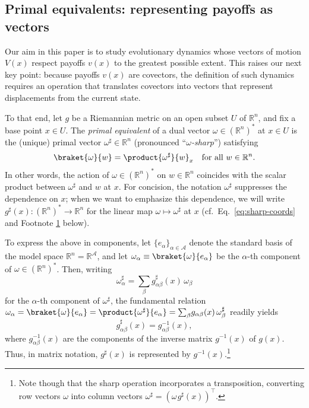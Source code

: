 \documentclass[reqno]{amsart}
\theoremstyle{plain}
\theoremstyle{definition}
\theoremstyle{remark}
\numberwithin{equation}{section}
\numberwithin{theorem}{section}
\begin{document}
\subsection{Primal equivalents: representing payoffs as vectors}
\label{sec:sharp}

Our aim in this paper is to study evolutionary dynamics whose vectors of motion ${V}(x)$ respect payoffs ${v}(x)$ to the greatest possible extent.
This raises our next key point:
because payoffs ${v}(x)$ are covectors, the definition of such dynamics requires an operation that translates covectors into vectors that represent displacements from the current state.

To that end, let $g$ be a Riemannian metric on an open subset ${U}$ of ${{\mathbb{R}}^{n}}$, and fix a base point $x\in{U}$.
The \emph{primal equivalent} of a dual vector $\omega \in{({\mathbb{R}}^{n})^{\ast}}$ at $x\in{U}$ is the (unique) primal vector $\omega^{\sharp} \in {{\mathbb{R}}^{n}}$ (pronounced ``\emph{$\omega$-sharp}'') satisfying
\begin{equation}
\label{eq:sharp}
\braket{\omega}{w}
=\product{\omega^{\sharp}}{w}_x	
	\quad
	\text{for all $w\in{{\mathbb{R}}^{n}}$}.
\end{equation}
In other words, the action of $\omega\in{({\mathbb{R}}^{n})^{\ast}}$ on $w\in{{\mathbb{R}}^{n}}$ coincides with the scalar product between $\omega^{\sharp}$ and $w$ at $x$.
For concision, the notation $\omega^{\sharp}$ suppresses the dependence on $x$;
when we want to emphasize this dependence, we will write $g^{\sharp}(x){\colon} {({\mathbb{R}}^{n})^{\ast}}\to{{\mathbb{R}}^{n}}$ for the linear map $\omega\mapsto \omega^{\sharp}$ at $x$ (cf.~Eq.~\eqref{eq:sharp-coords} and Footnote \ref{fn:sharp} below).

To express the above in components, let $\{{e}_{\alpha}\}_{\alpha\in{\mathcal{A}}}$ denote the standard basis of the model space ${{\mathbb{R}}^{n}} = {\mathbb{R}}^{\mathcal{A}}$, and let $\omega_{\alpha} \equiv \braket{\omega}{{e}_{\alpha}}$ be the $\alpha$-th component of $\omega\in{({\mathbb{R}}^{n})^{\ast}}$.
Then, writing
\begin{equation}
\label{eq:sharp-coords}
\omega_{\alpha}^{\sharp}
	= {\sum\nolimits}_{\beta}   g_{\alpha\beta}^{\sharp}(x) \, \omega_{\beta}
\end{equation}
for the $\alpha$-th component of $\omega^{\sharp}$, the fundamental relation $\omega_{\alpha} = \braket{\omega}{{e}_{\alpha}} = \product{\omega^{\sharp}}{{e}_{\alpha}} = {\sum\nolimits}_{\beta}  g_{\alpha\beta}(x) \, \omega_{\beta}^{\sharp}$ readily yields
\begin{equation}
\label{eq:ginv}
g_{\alpha\beta}^{\sharp}(x)
	= g_{\alpha\beta}^{-1}(x),
\end{equation}
where $g_{\alpha\beta}^{-1}(x)$ are the components of the inverse matrix $g^{-1}(x)$ of $g(x)$. 
Thus, in matrix notation, $g^{\sharp}(x)$ is represented by $g^{-1}(x)$.\footnote{\label{fn:sharp}
Note though that the sharp operation incorporates a transposition, converting row vectors $\omega$ into column vectors $\omega^\sharp = (\omega\hspace{1pt} g^{\sharp}(x))^{\!\top}$.}
\end{document}
